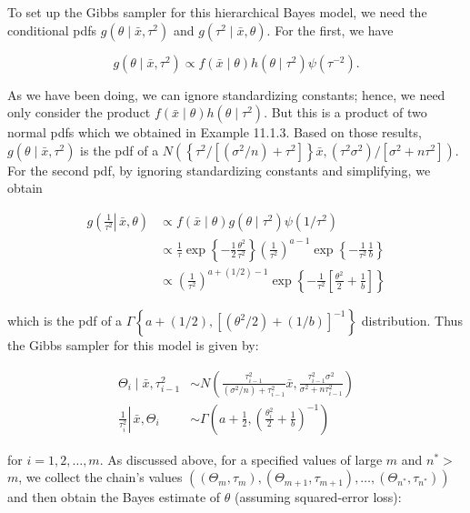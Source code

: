 To set up the Gibbs sampler for this hierarchical Bayes model, we need the conditional pdfs $g\left(\theta \mid \bar{x}, \tau^{2}\right)$ and $g\left(\tau^{2} \mid \bar{x}, \theta\right)$. For the first, we have

$$
g\left(\theta \mid \bar{x}, \tau^{2}\right) \propto f(\bar{x} \mid \theta) h\left(\theta \mid \tau^{2}\right) \psi\left(\tau^{-2}\right) .
$$

As we have been doing, we can ignore standardizing constants; hence, we need only consider the product $f(\bar{x} \mid \theta) h\left(\theta \mid \tau^{2}\right)$. But this is a product of two normal pdfs which we obtained in Example 11.1.3. Based on those results, $g\left(\theta \mid \bar{x}, \tau^{2}\right)$ is the pdf of a $N\left(\left\{\tau^{2} /\left[\left(\sigma^{2} / n\right)+\tau^{2}\right]\right\} \bar{x},\left(\tau^{2} \sigma^{2}\right) /\left[\sigma^{2}+n \tau^{2}\right]\right)$. For the second pdf, by ignoring standardizing constants and simplifying, we obtain


\begin{align*}
g\left(\left.\frac{1}{\tau^{2}} \right\rvert\, \bar{x}, \theta\right) & \propto f(\bar{x} \mid \theta) g\left(\theta \mid \tau^{2}\right) \psi\left(1 / \tau^{2}\right) \\
& \propto \frac{1}{\tau} \exp \left\{-\frac{1}{2} \frac{\theta^{2}}{\tau^{2}}\right\}\left(\frac{1}{\tau^{2}}\right)^{a-1} \exp \left\{-\frac{1}{\tau^{2}} \frac{1}{b}\right\} \\
& \propto\left(\frac{1}{\tau^{2}}\right)^{a+(1 / 2)-1} \exp \left\{-\frac{1}{\tau^{2}}\left[\frac{\theta^{2}}{2}+\frac{1}{b}\right]\right\} \tag{11.4.7}
\end{align*}


which is the pdf of a $\Gamma\left\{a+(1 / 2),\left[\left(\theta^{2} / 2\right)+(1 / b)\right]^{-1}\right\}$ distribution. Thus the Gibbs sampler for this model is given by:


\begin{align*}
\Theta_{i} \mid \bar{x}, \tau_{i-1}^{2} & \sim N\left(\frac{\tau_{i-1}^{2}}{\left(\sigma^{2} / n\right)+\tau_{i-1}^{2}} \bar{x}, \frac{\tau_{i-1}^{2} \sigma^{2}}{\sigma^{2}+n \tau_{i-1}^{2}}\right) \\
\left.\frac{1}{\tau_{i}^{2}} \right\rvert\, \bar{x}, \Theta_{i} & \sim \Gamma\left(a+\frac{1}{2},\left(\frac{\theta_{i}^{2}}{2}+\frac{1}{b}\right)^{-1}\right) \tag{11.4.8}
\end{align*}


for $i=1,2, \ldots, m$. As discussed above, for a specified values of large $m$ and $n^{*}>$ $m$, we collect the chain's values $\left(\left(\Theta_{m}, \tau_{m}\right),\left(\Theta_{m+1}, \tau_{m+1}\right), \ldots,\left(\Theta_{n^{*}}, \tau_{n^{*}}\right)\right)$ and then obtain the Bayes estimate of $\theta$ (assuming squared-error loss):


